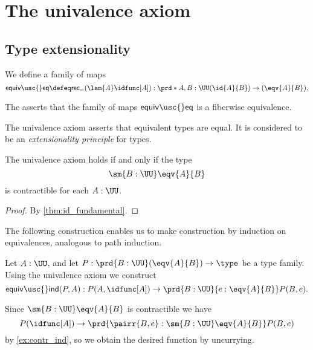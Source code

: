 \chapter{The univalence axiom}

\section{Type extensionality}
\begin{defn}
We define a family of maps
\begin{equation*}
\mathsf{equiv\usc{}eq}\defeq \mathsf{rec}_{=}(\lam{A}\idfunc[A]) : \prd*{A,B:\UU} (\id{A}{B})\to(\eqv{A}{B}).
\end{equation*}
\end{defn}

\begin{defn}
The  asserts that the family of maps $\mathsf{equiv\usc{}eq}$ is a fiberwise equivalence.
\end{defn}

The univalence axiom asserts that equivalent types are equal. It is considered to be an \emph{extensionality principle} for types.

\begin{lem}
The univalence axiom holds if and only if the type
\begin{equation*}
\sm{B:\UU}\eqv{A}{B}
\end{equation*}
is contractible for each $A:\UU$.
\end{lem}

\begin{proof}
By \autoref{thm:id_fundamental}.
\end{proof}

The following construction enables us to make construction by induction on equivalences, analogous to path induction.

\begin{defn}
Let $A:\UU$, and let $P:\prd{B:\UU} (\eqv{A}{B})\to\type$ be a type family. Using the univalence axiom we construct
\begin{equation*}
\mathsf{equiv\usc{}ind}(P,A) : P(A,\idfunc[A])\to \prd{B:\UU}{e:\eqv{A}{B}}P(B,e).
\end{equation*}
\end{defn}

\begin{constr}
Since $\sm{B:\UU}\eqv{A}{B}$ is contractible we have
\begin{equation*}
P(\idfunc[A])\to\prd{\pairr{B,e}:\sm{B:\UU}\eqv{A}{B}}P(B,e)
\end{equation*}
by \autoref{ex:contr_ind}, so we obtain the desired function by uncurrying.
\end{constr}

